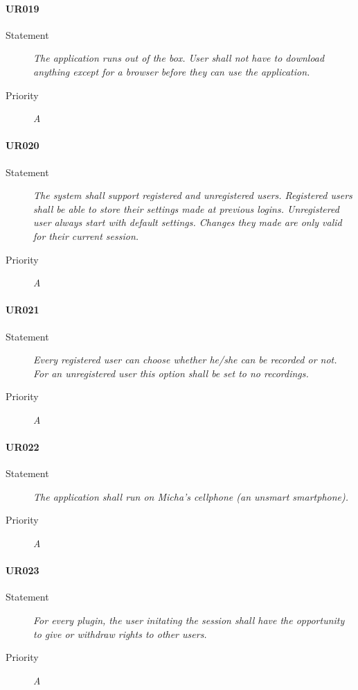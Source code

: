 \paragraph{UR019}
\begin{description}
\item[Statement] \textit{The application runs out of the box. User shall not
    have to download anything except for a browser before they can use the
    application.}
\item[Priority] \textit{A}
\end{description}

\paragraph{UR020}
\begin{description}
\item[Statement] \textit{The system shall support registered and unregistered
    users. Registered users shall be able to store their settings made at
    previous logins. Unregistered user always start with default
    settings. Changes they made are only valid for their current session.}
\item[Priority] \textit{A}
\end{description}

\paragraph{UR021}
\begin{description}
\item[Statement] \textit{Every registered user can choose whether he/she can
    be recorded or not. For an unregistered user this option shall be set to
    no recordings.}
\item[Priority] \textit{A}
\end{description}

\paragraph{UR022}
\begin{description}
\item[Statement] \textit{The application shall run on Micha's cellphone (an
    unsmart smartphone).}
\item[Priority] \textit{A}
\end{description}

\paragraph{UR023}
\begin{description}
\item[Statement] \textit{For every plugin, the user initating the
    session shall have the opportunity
    to give or withdraw rights to other users.}
\item[Priority] \textit{A}
\end{description}

